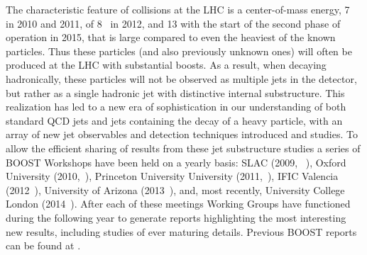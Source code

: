 The characteristic feature of collisions at the LHC is a center-of-mass energy, 7~\tev{} in 2010 and 2011, 
of 8~\tev{} in 2012, and 13\tev{} with the start of the second phase of operation in 2015, that is large
compared to even the heaviest of the known particles.  Thus these particles (and also previously unknown ones)
will often be produced at the LHC with
substantial boosts.  As a result, when decaying hadronically, these particles will not be observed as multiple jets in the detector, but rather
as a single hadronic jet with distinctive internal substructure.  This realization has led to a new era of sophistication
in our understanding of  both standard QCD jets and jets containing the decay of a heavy particle, with an array
of new jet observables and detection techniques introduced and studies.  To allow the efficient sharing of 
results from these jet substructure studies a series of BOOST Workshops have been held on a yearly basis:
SLAC (2009, ~\cite{Boost:2009xx}), 
Oxford University (2010,~\cite{Boost:2010xx}), Princeton 
University University (2011,~\cite{Boost:2011xx}),  IFIC Valencia (2012~\cite{Boost:2012xx}), 
University of Arizona (2013~\cite{Boost:2013xx}), and, most recently, University College London (2014~\cite{Boost:2014xx}).
After each of these meetings Working Groups have functioned during the following year to generate reports
highlighting the most interesting new results, including studies of ever maturing details.   Previous BOOST reports
can be found at \cite{Abdesselam:2010pt,Altheimer:2012mn,Altheimer:2013yza}.

